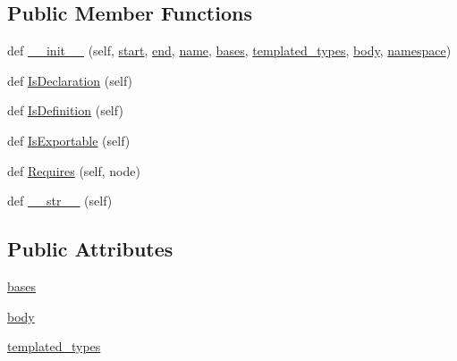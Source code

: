 \subsection*{Public Member Functions}
\begin{DoxyCompactItemize}
\item 
def \mbox{\hyperlink{classscripts_1_1generator_1_1cpp_1_1ast_1_1_class_ababc47bedf391a58276af889459ff517}{\+\_\+\+\_\+init\+\_\+\+\_\+}} (self, \mbox{\hyperlink{classscripts_1_1generator_1_1cpp_1_1ast_1_1_node_a27ce0a583baee598b75ac6dd21f8575b}{start}}, \mbox{\hyperlink{classscripts_1_1generator_1_1cpp_1_1ast_1_1_node_a8e3394f9dd405352610ff9be4f284e2c}{end}}, \mbox{\hyperlink{classscripts_1_1generator_1_1cpp_1_1ast_1_1___generic_declaration_a7cc4e9a1dace9c627d7fe4ce614a8888}{name}}, \mbox{\hyperlink{classscripts_1_1generator_1_1cpp_1_1ast_1_1_class_aaad5058196f4bf525a6fc2d18c760ad3}{bases}}, \mbox{\hyperlink{classscripts_1_1generator_1_1cpp_1_1ast_1_1_class_a3d1cc927ef0c536559f656321f64581e}{templated\+\_\+types}}, \mbox{\hyperlink{classscripts_1_1generator_1_1cpp_1_1ast_1_1_class_a43b72ebed2f3483dc597209fd7468536}{body}}, \mbox{\hyperlink{classscripts_1_1generator_1_1cpp_1_1ast_1_1___generic_declaration_a6e7fb8f951551af19f2366876a150817}{namespace}})
\item 
def \mbox{\hyperlink{classscripts_1_1generator_1_1cpp_1_1ast_1_1_class_a27fbcb116e330e2c0be9edb285c7ce9b}{Is\+Declaration}} (self)
\item 
def \mbox{\hyperlink{classscripts_1_1generator_1_1cpp_1_1ast_1_1_class_af1c4b935189850c6515c7fe75046c292}{Is\+Definition}} (self)
\item 
def \mbox{\hyperlink{classscripts_1_1generator_1_1cpp_1_1ast_1_1_class_a56180abf003818d8d244fb38b4845e0e}{Is\+Exportable}} (self)
\item 
def \mbox{\hyperlink{classscripts_1_1generator_1_1cpp_1_1ast_1_1_class_a5eccc02b0b7bb9c38a01cd6f50802b08}{Requires}} (self, node)
\item 
def \mbox{\hyperlink{classscripts_1_1generator_1_1cpp_1_1ast_1_1_class_a40bf2be7fb929cd0604072340b89097d}{\+\_\+\+\_\+str\+\_\+\+\_\+}} (self)
\end{DoxyCompactItemize}
\subsection*{Public Attributes}
\begin{DoxyCompactItemize}
\item 
\mbox{\hyperlink{classscripts_1_1generator_1_1cpp_1_1ast_1_1_class_aaad5058196f4bf525a6fc2d18c760ad3}{bases}}
\item 
\mbox{\hyperlink{classscripts_1_1generator_1_1cpp_1_1ast_1_1_class_a43b72ebed2f3483dc597209fd7468536}{body}}
\item 
\mbox{\hyperlink{classscripts_1_1generator_1_1cpp_1_1ast_1_1_class_a3d1cc927ef0c536559f656321f64581e}{templated\+\_\+types}}
\end{DoxyCompactItemize}


